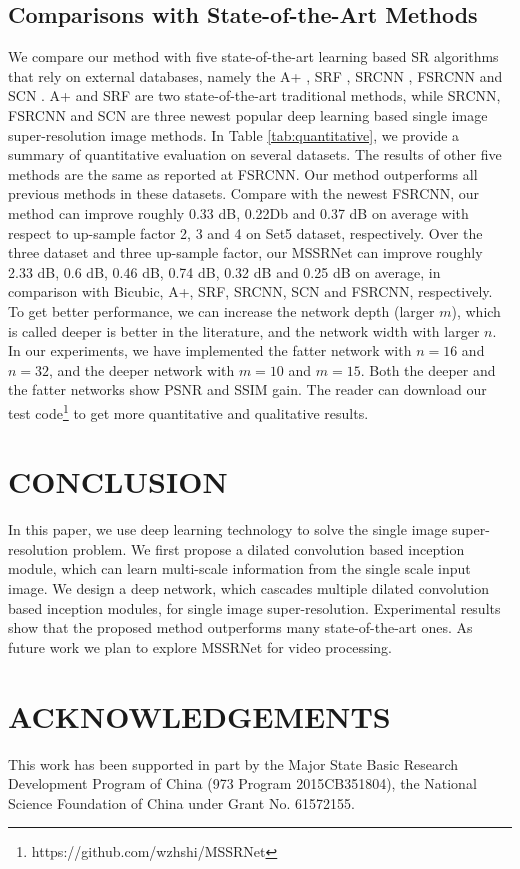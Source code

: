 \documentclass{article}
\begin{document}
\subsection{Comparisons with State-of-the-Art Methods}
\label{subsec:comparisons}

We compare our method with five state-of-the-art learning based SR algorithms that rely on external databases, namely the A+ \cite{ref22}, SRF \cite{ref23}, SRCNN \cite{ref4,ref5}, FSRCNN \cite{ref7} and SCN \cite{ref24}. A+ and SRF are two state-of-the-art traditional methods, while SRCNN, FSRCNN and SCN are three newest popular deep learning based single image super-resolution image methods. In Table \ref{tab:quantitative}, we provide a summary of quantitative evaluation on several datasets. The results of other five methods are the same as reported at FSRCNN. Our method outperforms all previous methods in these datasets. Compare with the newest FSRCNN, our method can improve roughly 0.33 dB, 0.22Db and 0.37 dB on average with respect to up-sample factor 2, 3 and 4 on Set5 dataset, respectively. Over the three dataset and three up-sample factor, our MSSRNet can improve roughly 2.33 dB, 0.6 dB, 0.46 dB, 0.74 dB, 0.32 dB and 0.25 dB on average, in comparison with Bicubic, A+, SRF, SRCNN, SCN and FSRCNN, respectively. To get better performance, we can increase the network depth (larger $m$), which is called deeper is better in the literature, and the network width with larger $n$. In our experiments, we have implemented the fatter network with $n = 16$ and $n = 32$, and the deeper network with $m = 10$ and $m = 15$. Both the deeper and the fatter networks show PSNR and SSIM gain. The reader can download our test code\footnote{https://github.com/wzhshi/MSSRNet}  to get more quantitative and qualitative results.

\section{CONCLUSION}
\label{sec:conclution}

In this paper, we use deep learning technology to solve the single image super-resolution problem. We first propose a dilated convolution based inception module, which can learn multi-scale information from the single scale input image. We design a deep network, which cascades multiple dilated convolution based inception modules, for single image super-resolution. Experimental results show that the proposed method outperforms many state-of-the-art ones. As future work we plan to explore MSSRNet for video processing.

\section{ACKNOWLEDGEMENTS}
\label{sec:acknowledgements}

This work has been supported in part by the Major State Basic Research Development Program of China (973 Program 2015CB351804), the National Science Foundation of China under Grant No. 61572155.





\end{document}

